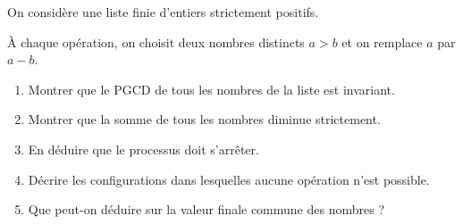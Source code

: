 On considère une liste finie d'entiers strictement positifs.

À chaque opération, on choisit deux nombres distincts $a > b$ et on remplace
$a$ par $a - b$.
\begin{enumerate}
  \item Montrer que le PGCD de tous les nombres de la liste est invariant.
  \item Montrer que la somme de tous les nombres diminue strictement.
  \item En déduire que le processus doit s'arrêter.
  \item Décrire les configurations dans lesquelles aucune opération n'est
  possible.
  \item Que peut-on déduire sur la valeur finale commune des nombres ?
\end{enumerate}
